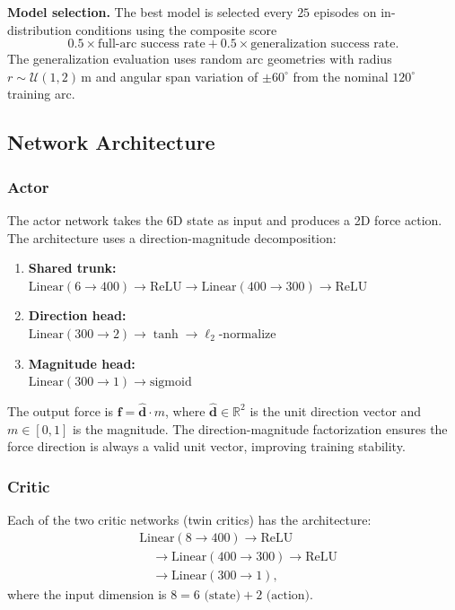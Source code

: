 \noindent\textbf{Model selection.}
The best model is selected every $25$ episodes on in-distribution conditions using the composite score
\[
0.5 \times \text{full-arc success rate}
+ 0.5 \times \text{generalization success rate}.
\]
The generalization evaluation uses random arc geometries with radius $r \sim \mathcal{U}(1, 2)$\,m and angular span variation of $\pm 60^\circ$ from the nominal $120^\circ$ training arc.

\subsection{Network Architecture}
\label{app:network}

\subsubsection{Actor}

The actor network takes the 6D state as input and produces a 2D force action.
The architecture uses a direction-magnitude decomposition:

\begin{enumerate}
    \item \textbf{Shared trunk:}\\
    $\mathrm{Linear}(6 \!\to\! 400) \!\to\! \mathrm{ReLU} \!\to\! \mathrm{Linear}(400 \!\to\! 300) \!\to\! \mathrm{ReLU}$
    \item \textbf{Direction head:}\\
    $\mathrm{Linear}(300 \!\to\! 2) \to \tanh \to \ell_2\text{-normalize}$
    \item \textbf{Magnitude head:}\\
    $\mathrm{Linear}(300 \!\to\! 1) \to \mathrm{sigmoid}$
\end{enumerate}

The output force is $\mathbf{f} = \hat{\mathbf{d}} \cdot m$, where $\hat{\mathbf{d}} \in \mathbb{R}^2$ is the unit direction vector and $m \in [0, 1]$ is the magnitude.
The direction-magnitude factorization ensures the force direction is always a valid unit vector, improving training stability.

\subsubsection{Critic}

Each of the two critic networks (twin critics) has the architecture:
%
\begin{align*}
    &\mathrm{Linear}(8 \to 400) \to \mathrm{ReLU} \\
    &\quad\to \mathrm{Linear}(400 \to 300) \to \mathrm{ReLU} \\
    &\quad\to \mathrm{Linear}(300 \to 1),
\end{align*}
%
where the input dimension is $8 = 6\text{ (state)} + 2\text{ (action)}$.

